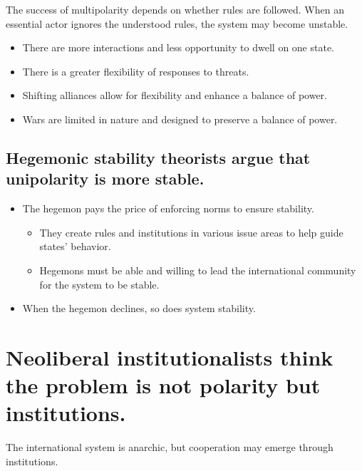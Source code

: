 \documentclass[
]{book}
\begin{document}
The success of multipolarity depends on whether rules are followed. When an essential actor ignores the understood rules, the system may become unstable.

\begin{itemize}
\item
  There are more interactions and less opportunity to dwell on one state.
\item
  There is a greater flexibility of responses to threats.
\item
  Shifting alliances allow for flexibility and enhance a balance of power.
\item
  Wars are limited in nature and designed to preserve a balance of power.
\end{itemize}

\hypertarget{hegemonic-stability-theorists-argue-that-unipolarity-is-more-stable.}{%
\subsection{Hegemonic stability theorists argue that unipolarity is more stable.}\label{hegemonic-stability-theorists-argue-that-unipolarity-is-more-stable.}}

\begin{itemize}
\item
  The hegemon pays the price of enforcing norms to ensure stability.

  \begin{itemize}
  \item
    They create rules and institutions in various issue areas to help guide states' behavior.
  \item
    Hegemons must be able and willing to lead the international community for the system to be stable.
  \end{itemize}
\item
  When the hegemon declines, so does system stability.
\end{itemize}

\hypertarget{neoliberal-institutionalists-think-the-problem-is-not-polarity-but-institutions.}{%
\section{Neoliberal institutionalists think the problem is not polarity but institutions.}\label{neoliberal-institutionalists-think-the-problem-is-not-polarity-but-institutions.}}

The international system is anarchic, but cooperation may emerge through institutions.
\end{document}
